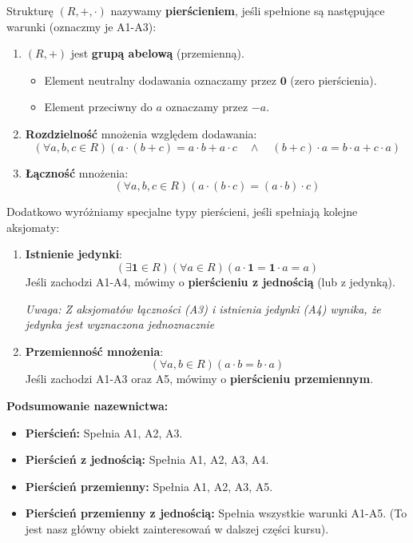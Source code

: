 \begin{definition}
    Strukturę $(R, +, \cdot)$ nazywamy \textbf{pierścieniem}, jeśli spełnione są następujące warunki (oznaczmy je A1-A3):
    \begin{enumerate}[label=A\arabic*.]
        \item $(R, +)$ jest \textbf{grupą abelową} (przemienną).
        \begin{itemize}
            \item Element neutralny dodawania oznaczamy przez $\mathbf{0}$ (zero pierścienia).
            \item Element przeciwny do $a$ oznaczamy przez $-a$.
        \end{itemize}
        \item \textbf{Rozdzielność} mnożenia względem dodawania:
        \[ (\forall a,b,c \in R) \left( a \cdot (b+c) = a \cdot b + a \cdot c \quad \land \quad (b+c) \cdot a = b \cdot a + c \cdot a \right) \]
        \item \textbf{Łączność} mnożenia:
        \[ (\forall a,b,c \in R) \left( a \cdot (b \cdot c) = (a \cdot b) \cdot c \right) \]
    \end{enumerate}
    
    Dodatkowo wyróżniamy specjalne typy pierścieni, jeśli spełniają kolejne aksjomaty:
    \begin{enumerate}[label=A\arabic*., start=4]
        \item \textbf{Istnienie jedynki}:
        \[ (\exists \mathbf{1} \in R)(\forall a \in R) (a \cdot \mathbf{1} = \mathbf{1} \cdot a = a) \]
        Jeśli zachodzi A1-A4, mówimy o \textbf{pierścieniu z jednością} (lub z jedynką).
        
	\textit{Uwaga: Z aksjomatów łączności (A3) i istnienia jedynki (A4) wynika, że jedynka jest wyznaczona jednoznacznie}
        \item \textbf{Przemienność mnożenia}:
        \[ (\forall a,b \in R) (a \cdot b = b \cdot a) \]
        Jeśli zachodzi A1-A3 oraz A5, mówimy o \textbf{pierścieniu przemiennym}.
    \end{enumerate}
\end{definition}

\noindent \textbf{Podsumowanie nazewnictwa:}
\begin{itemize}
    \item \textbf{Pierścień:} Spełnia A1, A2, A3.
    \item \textbf{Pierścień z jednością:} Spełnia A1, A2, A3, A4.
    \item \textbf{Pierścień przemienny:} Spełnia A1, A2, A3, A5.
    \item \textbf{Pierścień przemienny z jednością:} Spełnia wszystkie warunki A1-A5. (To jest nasz główny obiekt zainteresowań w dalszej części kursu).
\end{itemize}

